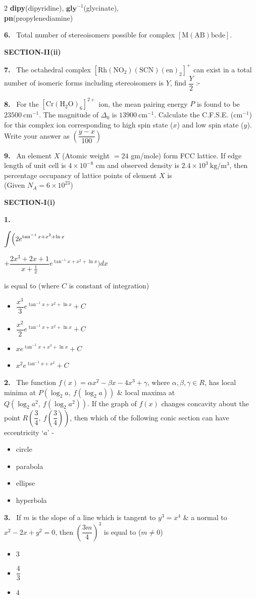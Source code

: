 \documentclass[10pt]{extarticle}
\newcommand{\partsec}[2]{\par\medskip\noindent{\large\bfseries PART-#1: #2}\par\smallskip}
\newcommand{\sect}[1]{\par\smallskip\noindent\textbf{#1}\par}
\newcommand{\qn}[1]{\par\smallskip\noindent\textbf{#1.}~}
\newenvironment{qoptions}{\begin{itemize}[leftmargin=1.8em,itemsep=1pt,topsep=2pt,label={}]}{\end{itemize}}
\newcommand{\opt}[2]{\item[(#1)] #2}
\begin{document}
\begin{multicols}{2}
\textbf{dipy}(dipyridine), $\textbf{gly}^{-1}$(glycinate),\\
\textbf{pn}(propylenediamine)
\qn{6} Total number of stereoisomers possible for complex $[\mathrm{M(AB)bcde}]$.
\sect{SECTION-II(ii)}
\qn{7} The octahedral complex $[\mathrm{Rh(NO_2)(SCN)(en)_2}]^+$ can exist in a total number of isomeric forms including stereoisomers is $Y$, find $\dfrac Y2$ :-
\qn{8} For the $[\mathrm{Cr(H_2O)_6}]^{2+}$ ion, the mean pairing energy $P$ is found to be $23500\ \mathrm{cm^{-1}}$. The magnitude of $\Delta_0$ is $13900\ \mathrm{cm^{-1}}$. Calculate the C.F.S.E. ($\mathrm{cm^{-1}}$) for this complex ion corresponding to high spin state ($x$) and low spin state ($y$). Write your answer as $\left(\dfrac{y-x}{100}\right)$
\qn{9} An element $X$ (Atomic weight $=24$ gm/mole) form FCC lattice. If edge length of unit cell is $4\times10^{-8}$ cm and observed density is $2.4\times10^3\ \mathrm{kg/m^3}$, then percentage occupancy of lattice points of element $X$ is\\
(Given $N_A=6\times10^{23}$)
\partsec{3}{MATHEMATICS}
\sect{SECTION-I(i)}
\qn{1}\par\noindent\hfill{\small$\displaystyle\int\Bigl(2e^{\tan^{-1}x+x^2+\ln x}$}\hfill\null\par\noindent\hfill{\small$\displaystyle+\dfrac{2x^3+2x+1}{x+\frac1x}e^{\tan^{-1}x+x^2+\ln x}\Bigr)dx$}\hfill\null\par is equal to (where $C$ is constant of integration)
\begin{qoptions}
\opt{A}{$\dfrac{x^3}{3}e^{\tan^{-1}x+x^2+\ln x}+C$}
\opt{B}{$\dfrac{x^2}{2}e^{\tan^{-1}x+x^2+\ln x}+C$}
\opt{C}{$xe^{\tan^{-1}x+x^3+\ln x}+C$}
\opt{D}{$x^2e^{\tan^{-1}x+x^2}+C$}
\end{qoptions}
\qn{2} The function $f(x)=\alpha x^2-\beta x-4x^3+\gamma$, where $\alpha,\beta,\gamma\in R$, has local minima at $P(\log_2a,\ f(\log_2a))$ \& local maxima at $Q(\log_2a^2,\ f(\log_2a^2))$. If the graph of $f(x)$ changes concavity about the point $R\left(\dfrac34,\ f\left(\dfrac34\right)\right)$, then which of the following conic section can have eccentricity `$a$' -
\begin{qoptions}
\opt{A}{circle}
\opt{B}{parabola}
\opt{C}{ellipse}
\opt{D}{hyperbola}
\end{qoptions}
\qn{3} If $m$ is the slope of a line which is tangent to $y^3=x^4$ \& a normal to $x^2-2x+y^2=0$, then $\left(\dfrac{3m}{4}\right)^3$ is equal to ($m\neq0$)
\begin{qoptions}
\opt{A}{$3$}
\opt{B}{$\dfrac43$}
\opt{C}{$4$}

\end{qoptions}
\end{multicols}
\end{document}
